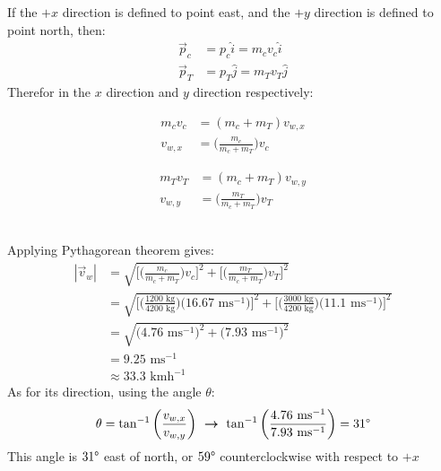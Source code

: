 \documentclass[a4paper]{article}
\begin{document}
\begin{shaded}
\begin{center}
    \end{center}
    If the $+x$ direction is defined to point east, and the $+y$ direction is defined to point north, then:
    \begin{align*}
        \vec{p}_c &= p_c\hat{i} = m_c v_c \hat{i}\\
        \vec{p}_T &= p_T\hat{j} = m_T v_T \hat{j}
    \end{align*}
    Therefor in the $x$ direction and $y$ direction respectively:\\
    \begin{minipage}{0.45\textwidth}
        \begin{align*}
            m_cv_c &= (m_c + m_T)v_{w,x}\\
            v_{w,x} &= \bigg(\frac{m_c}{m_c + m_T}\bigg)v_c
        \end{align*}
    \end{minipage}
    \begin{minipage}{0.45\textwidth}
        \begin{align*}
            m_Tv_T &= (m_c + m_T)v_{w,y}\\
            v_{w,y} &= \bigg(\frac{m_T}{m_c + m_T}\bigg)v_T
        \end{align*}
    \end{minipage}
    \vspace{2mm}\\
    Applying Pythagorean theorem gives:
    \begin{align*}
        |\vec{v}_w| &= \sqrt{\bigg[\bigg(\frac{m_c}{m_c + m_T}\bigg)v_c\bigg]^2 + \bigg[\bigg(\frac{m_T}{m_c + m_T}\bigg)v_T\bigg]^2}\\
        &= \sqrt{\bigg[\bigg(\frac{1200\text{ kg}}{4200\text{ kg}}\bigg)\Big(16.67\text{ ms}^{-1}\Big)\bigg]^2 + \bigg[\bigg(\frac{3000\text{ kg}}{4200\text{ kg}}\bigg)\Big(11.1\text{ ms}^{-1}\Big)\bigg]^2}\\
        &= \sqrt{\Big(4.76\text{ ms}^{-1}\Big)^2 + \Big(7.93\text{ ms}^{-1}\Big)^2}\\
        &= 9.25\text{ ms}^{-1}\\
        &\approx 33.3\text{ kmh}^{-1}
    \end{align*}
    As for its direction, using the angle $\theta$:
    \begin{align*}
        \theta = \tan^{-1}\bigg(\frac{v_{w,x}}{v_{w,y}}\bigg)\ \boldsymbol{\to}\ \tan^{-1}\bigg(\frac{4.76\text{ ms}^{-1}}{7.93\text{ ms}^{-1}}\bigg) = 31\degree
    \end{align*}
    This angle is $31\degree$ east of north, or $59\degree$ counterclockwise with respect to $+x$
\end{shaded}
\end{document}

